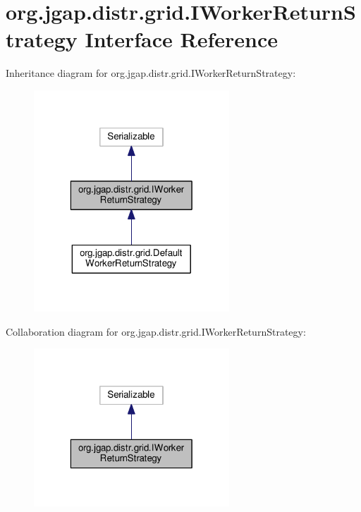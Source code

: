 \hypertarget{interfaceorg_1_1jgap_1_1distr_1_1grid_1_1_i_worker_return_strategy}{\section{org.\-jgap.\-distr.\-grid.\-I\-Worker\-Return\-Strategy Interface Reference}
\label{interfaceorg_1_1jgap_1_1distr_1_1grid_1_1_i_worker_return_strategy}
}


Inheritance diagram for org.\-jgap.\-distr.\-grid.\-I\-Worker\-Return\-Strategy\-:
\nopagebreak
\begin{figure}[H]
\begin{center}
\leavevmode
\includegraphics[width=208pt]{interfaceorg_1_1jgap_1_1distr_1_1grid_1_1_i_worker_return_strategy__inherit__graph}
\end{center}
\end{figure}


Collaboration diagram for org.\-jgap.\-distr.\-grid.\-I\-Worker\-Return\-Strategy\-:
\nopagebreak
\begin{figure}[H]
\begin{center}
\leavevmode
\includegraphics[width=208pt]{interfaceorg_1_1jgap_1_1distr_1_1grid_1_1_i_worker_return_strategy__coll__graph}
\end{center}
\end{figure}

